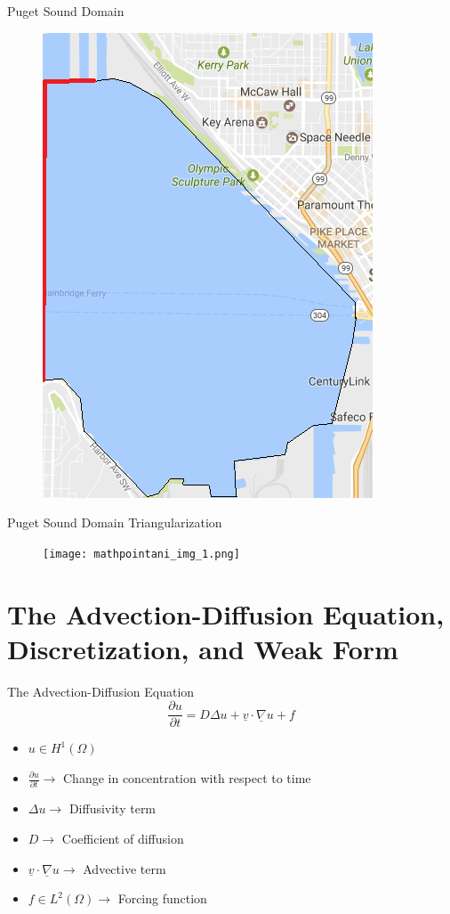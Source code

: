 \documentclass[10pt]{beamer}
\begin{document}
\begin{frame}{Puget Sound Domain}\label{Puget Sound Domain}
\begin{figure}

   \includegraphics[width=0.4\linewidth]{domainoutline.png}
\end{figure}
\hyperlink{Questions}{}
\end{frame}

\begin{frame}{Puget Sound Domain Triangularization}\label{Puget Sound Domain Triangularization}
\begin{figure}

   \texttt{[image: mathpointani\_img\_1.png]}
\end{figure}
\hyperlink{Questions}{}
\end{frame}


\section{The Advection-Diffusion Equation, Discretization, and Weak Form} 
\begin{frame}{The Advection-Diffusion Equation}\label{The Advection-Diffusion Equation}
\begin{equation}
\frac{\partial u}{\partial t}= D\Delta u + \underline{v} \cdot \underline{\nabla}u+f
\end{equation}
\begin{itemize}
\item $u \in  H^{1}\left(\Omega \right)$
\item $\frac{\partial u}{\partial t} \rightarrow$ Change in concentration with respect to time
\item $\Delta u \rightarrow$ Diffusivity term
\item $D \rightarrow$ Coefficient of diffusion
\item$\underline{v} \cdot \underline{\nabla}u \rightarrow$ Advective term
\item $f \in L^{2}\left(\Omega \right)\rightarrow$ Forcing function 
\end{itemize}
\hyperlink{Questions}{}
\end{frame}
\end{document}
